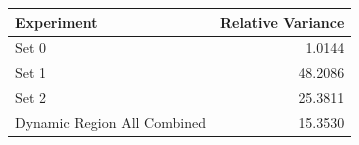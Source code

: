 \begin{tabular}{lr}
\toprule
Experiment & Relative Variance \\
\midrule
Set 0 & 1.0144 \\
Set 1 & 48.2086 \\
Set 2 & 25.3811 \\
Dynamic Region All Combined & 15.3530 \\
\bottomrule
\end{tabular}
